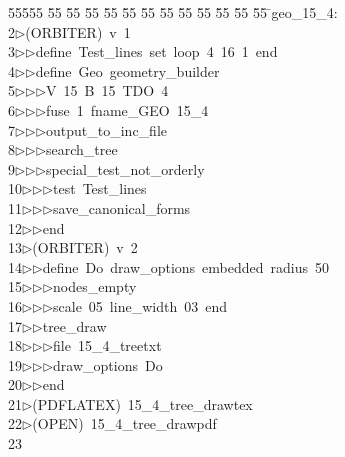 %
%
\begin{tabbing}
55555 \= 55 \= 55 \= 55 \= 55 \= 55 \= 55 \= 55 \= 55 \= 55 \= 55 \= 55 \= 55 \= \>geo\_15\_4:\\[0pt]
2\>$\triangleright$\>(ORBITER)\ v\ 1\ \\[0pt]
3\>$\triangleright$\>$\triangleright$\>define\ Test\_lines\ set\ loop\ 4\ 16\ 1\ end\ \\[0pt]
4\>$\triangleright$\>$\triangleright$\>define\ Geo\ geometry\_builder\ \\[0pt]
5\>$\triangleright$\>$\triangleright$\>$\triangleright$\>V\ 15\ B\ 15\ TDO\ 4\ \\[0pt]
6\>$\triangleright$\>$\triangleright$\>$\triangleright$\>fuse\ 1\ fname\_GEO\ 15\_4\ \\[0pt]
7\>$\triangleright$\>$\triangleright$\>$\triangleright$\>output\_to\_inc\_file\ \\[0pt]
8\>$\triangleright$\>$\triangleright$\>$\triangleright$\>search\_tree\ \\[0pt]
9\>$\triangleright$\>$\triangleright$\>$\triangleright$\>special\_test\_not\_orderly\ \\[0pt]
10\>$\triangleright$\>$\triangleright$\>$\triangleright$\>test\ Test\_lines\ \\[0pt]
11\>$\triangleright$\>$\triangleright$\>$\triangleright$\>save\_canonical\_forms\ \\[0pt]
12\>$\triangleright$\>$\triangleright$\>end\\[0pt]
13\>$\triangleright$\>(ORBITER)\ v\ 2\ \\[0pt]
14\>$\triangleright$\>$\triangleright$\>define\ Do\ draw\_options\ embedded\ radius\ 50\ \\[0pt]
15\>$\triangleright$\>$\triangleright$\>$\triangleright$\>nodes\_empty\ \\[0pt]
16\>$\triangleright$\>$\triangleright$\>$\triangleright$\>scale\ 05\ line\_width\ 03\ end\ \\[0pt]
17\>$\triangleright$\>$\triangleright$\>tree\_draw\ \\[0pt]
18\>$\triangleright$\>$\triangleright$\>$\triangleright$\>file\ 15\_4\_treetxt\ \\[0pt]
19\>$\triangleright$\>$\triangleright$\>$\triangleright$\>draw\_options\ Do\ \\[0pt]
20\>$\triangleright$\>$\triangleright$\>end\ \\[0pt]
21\>$\triangleright$\>(PDFLATEX)\ 15\_4\_tree\_drawtex\\[0pt]
22\>$\triangleright$\>(OPEN)\ 15\_4\_tree\_drawpdf\\[0pt]
23\>\end{tabbing}
